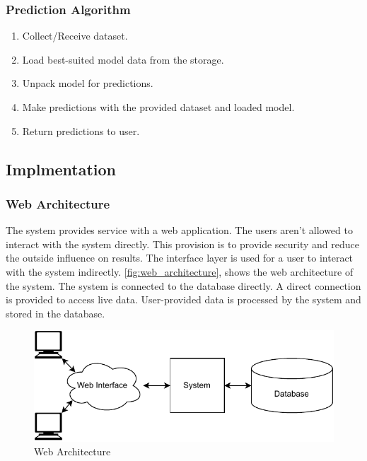 \documentclass[a4paper,fleqn]{cas-dc}
\begin{document}
\vspace{-0.5em}
\subsubsection*{Prediction Algorithm}\label{subsubsec:prediction_algorithm}
\vspace{0.5em}
\begin{enumerate}
    \item Collect/Receive dataset.
    \item Load best-suited model data from the storage.
    \item Unpack model for predictions.
    \item Make predictions with the provided dataset and loaded model.
    \item Return predictions to user.
\end{enumerate}

\subsection{Implmentation}\label{subsec:implmentation}

\subsubsection{Web Architecture}\label{subsubsec:web_architecture}

The system provides service with a web application. The users aren't allowed to interact with the system directly. This provision is to provide security and reduce the outside influence on results. The interface layer is used for a user to interact with the system indirectly. \autoref{fig:web_architecture}, shows the web architecture of the system. The system is connected to the database directly. A direct connection is provided to access live data. User-provided data is processed by the system and stored in the database.

\begin{figure}[ht]
    \centering
    \includegraphics[width=0.9\columnwidth]{web_architecture.pdf}
    \caption{Web Architecture}
    \label{fig:web_architecture}
\end{figure}
\end{document}
